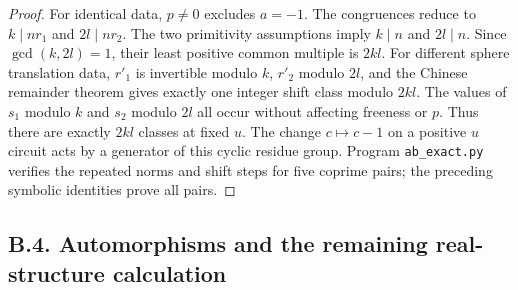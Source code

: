 \begin{proof}
For identical data, $p\ne0$ excludes $a=-1$. The congruences reduce to $k\mid nr_1$ and $2l\mid nr_2$. The two primitivity assumptions imply $k\mid n$ and $2l\mid n$. Since $\gcd(k,2l)=1$, their least positive common multiple is $2kl$. For different sphere translation data, $r'_1$ is invertible modulo $k$, $r'_2$ modulo $2l$, and the Chinese remainder theorem gives exactly one integer shift class modulo $2kl$. The values of $s_1$ modulo $k$ and $s_2$ modulo $2l$ all occur without affecting freeness or $p$. Thus there are exactly $2kl$ classes at fixed $u$. The change $c\mapsto c-1$ on a positive $u$ circuit acts by a generator of this cyclic residue group. Program \texttt{ab\_exact.py} verifies the repeated norms and shift steps for five coprime pairs; the preceding symbolic identities prove all pairs.
\end{proof}

\subsection{B.4. Automorphisms and the remaining real-structure calculation}

